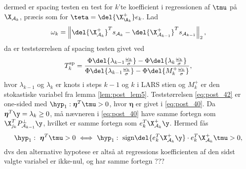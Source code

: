 dermed er spacing testen en test for \(k\)'te koefficient i regressionen af \(\tmu\) på \(\X_{\mathcal{A}_k}\), præcis som for \(\teta = \del{\X_{\A_k}^+} e_k\).
Lad
\begin{align}
\omega_k = \left\Vert \del{\X_{\mathcal{A}_k}^+}^T s_{\mathcal{A}_k} -   \del{\X_{\mathcal{A}_{k-1}}^+}^T s_{\mathcal{A}_{k-1}} \right\Vert_2, \label{eq:post_41}
\end{align}
da er teststørrelsen af spacing testen givet ved
\begin{align}
T_k^\text{sp}= \frac{\Phi \del{\lambda_{k-1} \frac{\omega_k}{\sigma}} - \Phi \del{\lambda_{k} \frac{\omega_k}{\sigma}}}{\Phi \del{\lambda_{k-1} \frac{\omega_k}{\sigma}} - \Phi \del{M_{k}^+ \frac{\omega_k}{\sigma}}}, \label{eq:post_42}
\end{align}
hvor \(\lambda_{k-1}\) og \(\lambda_k\) er knots i steps \(k-1\) og \(k\) i LARS stien og \(M_k^+\) er den stokastiske variabel fra lemma \ref{lem:post_lem5}.
Teststørrelsen \eqref{eq:post_42} er one-sided med \(\hyp_1:\boldsymbol{\eta}^T \tmu > 0 \), hvor \(\boldsymbol{\eta}\) er givet i \eqref{eq:post_40}.
Da \(\boldsymbol{\eta}^T \y = \lambda_k \geq 0\), må nævneren i \eqref{eq:post_40} have samme fortegn som \(\X_{j_k}^T P_{\mathcal{A}_{k-1}}^\perp \y \), hvilket er samme fortegn som \(e_k^T \X_{\mathcal{A}_k}^+ \y\).
Hermed fås
\begin{align*}
\hyp_1: \ \boldsymbol{\eta}^T \tmu > 0 \ \Longleftrightarrow \ \hyp_1: \ \text{sign} \del{e_k^T \X_{\mathcal{A}_k}^+ \y} \cdot e_k^T \X_{\mathcal{A}_k}^+ \tmu > 0,
\end{align*}
dvs den alternative hypotese er altså at regressions koefficienten af den sidst valgte variabel er ikke-nul, og har samme fortegn ???

